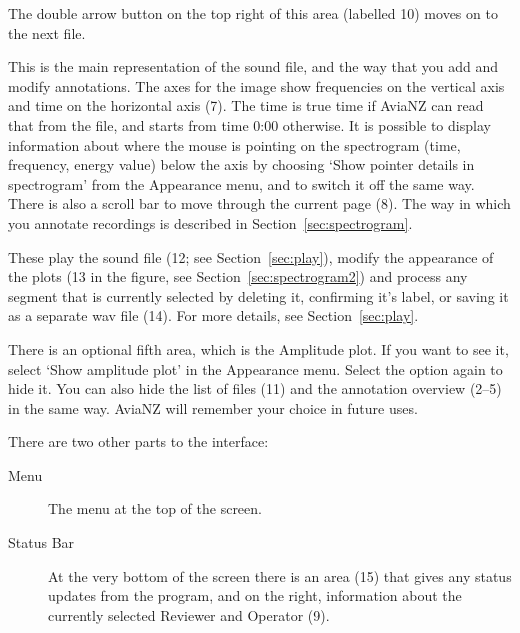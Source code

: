 \documentclass{article}
\begin{document}
\begin{description}
The double arrow button on the top right of this area (labelled 10) moves on to the next file.
	\item[Spectrogram (6)] This is the main representation of the sound file, and the way that you add and modify annotations. The axes for the image show frequencies on the vertical axis and time on the horizontal axis (7). The time is true time if AviaNZ can read that from the file, and starts from time 0:00 otherwise. It is possible to display information about where the mouse is pointing on the spectrogram (time, frequency, energy value) below the axis by choosing `Show pointer details in spectrogram' from the Appearance menu, and to switch it off the same way. There is also a scroll bar to move through the current page (8).
The way in which you annotate recordings is described in Section~\ref{sec:spectrogram}.
	\item[Controls] These play the sound file (12; see Section~\ref{sec:play}), modify the appearance of the plots (13 in the figure, see Section~\ref{sec:spectrogram2}) and process any segment that is currently selected by deleting it, confirming it's label, or saving it as a separate wav file (14).  For more details, see  Section~\ref{sec:play}.
	\end{description}

There is an optional fifth area, which is the Amplitude plot. If you want to see it, select `Show amplitude plot' in the Appearance menu. Select the option again to hide it. You can also hide the list of files (11) and the annotation overview (2--5) in the same way. AviaNZ will remember your choice in future uses.

There are two other parts to the interface:
	\begin{description}
	\item[Menu] The menu at the top of the screen. 
	\item[Status Bar] At the very bottom of the screen there is an area (15) that gives any status updates from the program, and on the right, information about the currently selected Reviewer and Operator (9).
	\end{description}
\end{document}
